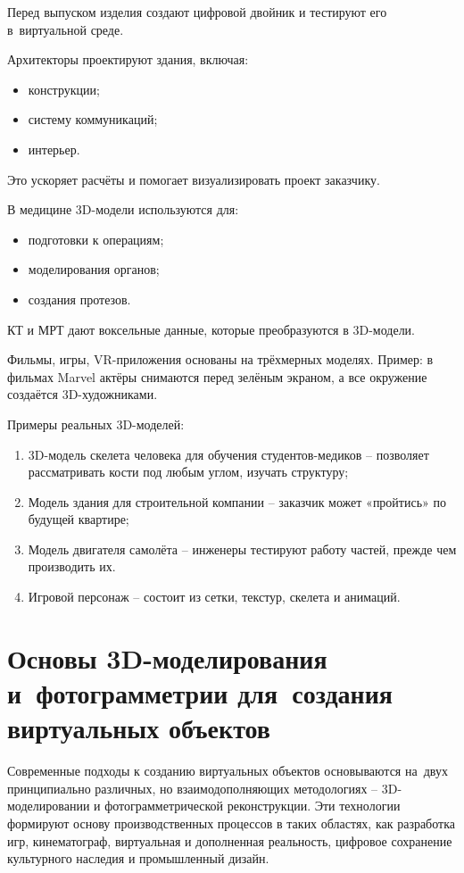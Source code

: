 \documentclass{ou}
\begin{document}
Перед выпуском изделия создают цифровой двойник и тестируют его в~виртуальной среде.

Архитекторы проектируют здания, включая:
\begin{itemize}[label=-, leftmargin=0em, itemindent=3.35em, nosep]
\item конструкции;
\item систему коммуникаций;
\item интерьер.
\end{itemize}

Это ускоряет расчёты и помогает визуализировать проект заказчику.

В медицине 3D-модели используются для:
\begin{itemize}[label=-, leftmargin=0em, itemindent=3.35em, nosep]
\item подготовки к операциям;
\item моделирования органов;
\item создания протезов.
\end{itemize}

КТ и МРТ дают воксельные данные, которые преобразуются в 3D-модели.

Фильмы, игры, VR-приложения основаны на трёхмерных моделях. Пример: в фильмах Marvel актёры снимаются перед зелёным экраном, а все окружение создаётся 3D-художниками.

Примеры реальных 3D-моделей:
\begin{enumerate}[leftmargin=0em, itemindent=3.75em, nosep, label=\arabic*)]
\item 3D-модель скелета человека для обучения студентов-медиков -- позволяет рассматривать кости под любым углом, изучать структуру;
\item Модель здания для строительной компании -- заказчик может «пройтись» по будущей квартире;
\item Модель двигателя самолёта -- инженеры тестируют работу частей, прежде чем производить их.
\item Игровой персонаж -- состоит из сетки, текстур, скелета и анимаций.
\end{enumerate}
\newpage
\section{Основы 3D-моделирования и~фотограмметрии для~создания виртуальных объектов}
Современные подходы к созданию виртуальных объектов основываются на~двух принципиально различных, но взаимодополняющих методологиях -- 3D-моделировании и фотограмметрической реконструкции. Эти технологии формируют основу производственных процессов в таких областях, как разработка игр, кинематограф, виртуальная и дополненная реальность, цифровое сохранение культурного наследия и промышленный дизайн.
\end{document}
